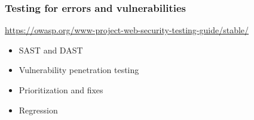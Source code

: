 \documentclass[13pt, aspectratio=169]{beamer}
\begin{document}
\begin{frame}
	\frametitle{Testing for errors and vulnerabilities}
	\url{https://owasp.org/www-project-web-security-testing-guide/stable/}
	\begin{itemize}
		\item SAST and DAST
		\item Vulnerability penetration testing
		\item Prioritization and fixes
		\item Regression
	\end{itemize}
\end{frame}
\end{document}
